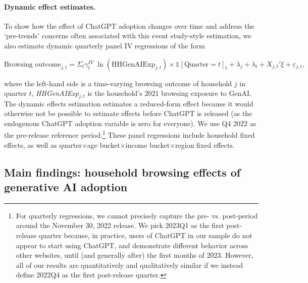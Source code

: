 \documentclass[12pt]{article}
\begin{document}
\paragraph{Dynamic effect estimates.} To show how the effect of ChatGPT adoption changes over time and address the `pre-trends' concerns often associated with this event study-style estimation, we also  estimate  dynamic quarterly panel IV regressions of the form 
\begin{center}$
\text{Browsing outcome}_{j,t} = \Sigma_t \gamma^{IV}_t \; \ln\left(\text{HHGenAIExp}_{j,t}\right) \times \mathbb{1}[\text{Quarter}=t]_t  + \lambda_j + \lambda_t + X_{j,t}'\xi + \varepsilon_{j,t},$
\end{center}
where the left-hand side is a time-varying browsing outcome of household $j$ in quarter $t$, \textit{HHGenAIExp}$_{j,t}$ is the household's 2021 browsing exposure to GenAI. The dynamic effects estimation estimates a reduced-form effect because it would otherwise not be possible to estimate effects before ChatGPT is released (as the endogenous ChatGPT adoption variable is zero for everyone). We use Q4 2022 as the pre-release reference period.\footnote{For quarterly regressions, we cannot precisely capture the pre- vs. post-period around the November 30, 2022 release. We pick 2023Q1 as the first post-release quarter because, in practice, users of ChatGPT in our sample do not appear to start using ChatGPT, and demonstrate different behavior across other websites, until (and generally after) the first months of 2023. However, all of our results are quantitatively and qualitatively similar if we instead define 2022Q4 as the first post-release quarter.} These panel regressions include household fixed effects,  as well as quarter$\times$age bucket$\times$income bucket$\times$region fixed effects.






\subsection{Main findings: household browsing effects of generative AI adoption}
\end{document}
